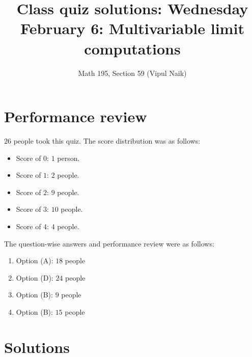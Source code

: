 \documentclass[10pt]{amsart}
\title{Class quiz solutions: Wednesday February 6: Multivariable limit computations}
\author{Math 195, Section 59 (Vipul Naik)}
\begin{document}
\maketitle

\section{Performance review}

$26$ people took this quiz. The score distribution was as follows:

\begin{itemize}
\item Score of $0$: $1$ person.
\item Score of $1$: $2$ people.
\item Score of $2$: $9$ people.
\item Score of $3$: $10$ people.
\item Score of $4$: $4$ people.
\end{itemize}

The question-wise answers and performance review were as follows:

\begin{enumerate}
\item Option (A): $18$ people
\item Option (D): $24$ people
\item Option (B): $9$ people
\item Option (B): $15$ people
\end{enumerate}
\section{Solutions}
\end{document}
